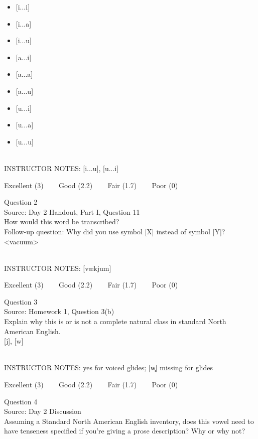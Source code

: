 \documentclass[12pt]{article}
\begin{document}
\begin{itemize} \item {[i...i]} \item {[i...a]} \item {[i...u]} \item {[a...i]} \item {[a...a]} \item {[a...u]} \item {[u...i]} \item {[u...a]} \item {[u...u]} \end{itemize}


~\\
INSTRUCTOR NOTES: [i...u], [u...i]


\vfill
Excellent (3) ~~~ Good (2.2) ~~~ Fair (1.7) ~~~ Poor (0)
\newpage

{\large Question 2}\\

Source: Day 2 Handout, Part I, Question 11\\

How would this word be transcribed?\\ Follow-up question: Why did you use symbol [X] instead of symbol [Y]?\\

<vacuum>


~\\
INSTRUCTOR NOTES: [vækjum]


\vfill
Excellent (3) ~~~ Good (2.2) ~~~ Fair (1.7) ~~~ Poor (0)
\newpage

{\large Question 3}\\

Source: Homework 1, Question 3(b)\\

Explain why this is or is not a complete natural class in standard North American English.\\

{[j]}, {[w]}


~\\
INSTRUCTOR NOTES: yes for voiced glides; [w̥] missing for glides


\vfill
Excellent (3) ~~~ Good (2.2) ~~~ Fair (1.7) ~~~ Poor (0)
\newpage

{\large Question 4}\\

Source: Day 2 Discussion\\

Assuming a Standard North American English inventory, does this vowel need to have tenseness specified if you're giving a prose description? Why or why not?\\
\end{document}
